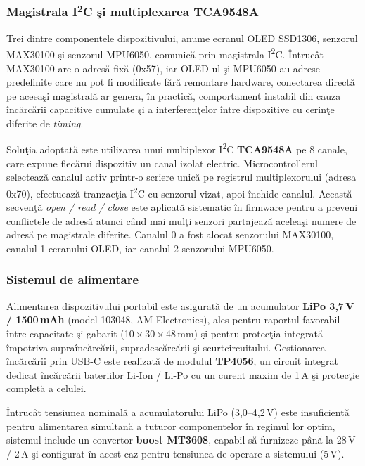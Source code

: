 \documentclass[12pt,a4paper]{article}
\begin{document}
\subsubsection{Magistrala I\textsuperscript{2}C şi multiplexarea TCA9548A}

Trei dintre componentele dispozitivului, anume ecranul OLED SSD1306, senzorul MAX30100 şi senzorul MPU6050, comunică prin magistrala I\textsuperscript{2}C. Întrucât MAX30100 are o adresă fixă (0x57), iar OLED-ul şi MPU6050 au adrese predefinite care nu pot fi modificate fără remontare hardware, conectarea directă pe aceeaşi magistrală ar genera, în practică, comportament instabil din cauza încărcării capacitive cumulate şi a interferenţelor între dispozitive cu cerinţe diferite de \textit{timing}.

Soluţia adoptată este utilizarea unui multiplexor I\textsuperscript{2}C \textbf{TCA9548A} pe 8 canale, care expune fiecărui dispozitiv un canal izolat electric. Microcontrollerul selectează canalul activ printr-o scriere unică pe registrul multiplexorului (adresa 0x70), efectuează tranzacţia I\textsuperscript{2}C cu senzorul vizat, apoi închide canalul. Această secvenţă \textit{open / read / close} este aplicată sistematic în firmware pentru a preveni conflictele de adresă atunci când mai mulţi senzori partajează aceleaşi numere de adresă pe magistrale diferite. Canalul 0 a fost alocat senzorului MAX30100, canalul 1 ecranului OLED, iar canalul 2 senzorului MPU6050.

\subsubsection{Sistemul de alimentare}

Alimentarea dispozitivului portabil este asigurată de un acumulator \textbf{LiPo 3{,}7\,V / 1500\,mAh} (model 103048, AM Electronics), ales pentru raportul favorabil între capacitate şi gabarit (10\,$\times$\,30\,$\times$\,48\,mm) şi pentru protecţia integrată împotriva supraîncărcării, supradescărcării şi scurtcircuitului. Gestionarea încărcării prin USB-C este realizată de modulul \textbf{TP4056}, un circuit integrat dedicat încărcării bateriilor Li-Ion / Li-Po cu un curent maxim de 1\,A şi protecţie completă a celulei.

Întrucât tensiunea nominală a acumulatorului LiPo (3{,}0--4{,}2\,V) este insuficientă pentru alimentarea simultană a tuturor componentelor în regimul lor optim, sistemul include un convertor \textbf{boost MT3608}, capabil să furnizeze până la 28\,V / 2\,A şi configurat în acest caz pentru tensiunea de operare a sistemului (5\,V).
\end{document}
